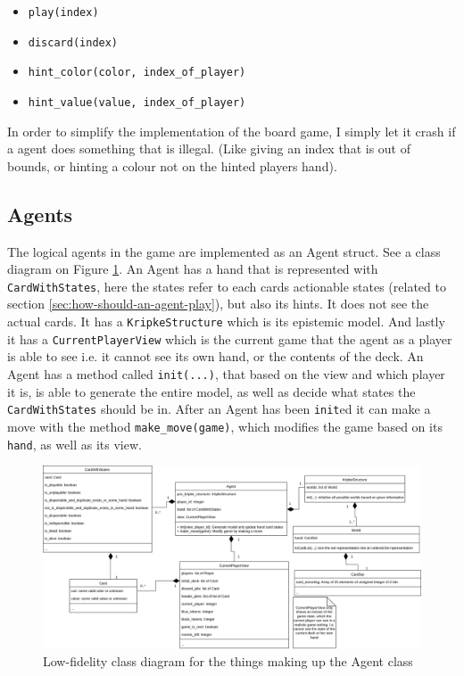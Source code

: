 \begin{itemize}
	\item {\tt play(index)}
	\item {\tt discard(index)}
	\item {\tt hint\_color(color, index\_of\_player) }
	\item {\tt hint\_value(value, index\_of\_player) }
\end{itemize}
In order to simplify the implementation of the board game, I simply let it crash if a agent does something that is illegal. (Like giving an index that is out of bounds, or hinting a colour not on the hinted players hand).


\subsection{Agents}
The logical agents in the game are implemented as an Agent struct. See a class diagram on Figure \ref{fig:Agent-class-diagram}.
An Agent has a hand that is represented with {\tt CardWithStates}, here the states refer to each cards actionable states (related to section \ref{sec:how-should-an-agent-play}), but also its hints. It does not see the actual cards. It has a {\tt KripkeStructure} which is its epistemic model. And lastly it has a {\tt CurrentPlayerView} which is the current game that the agent as a player is able to see i.e. it cannot see its own hand, or the contents of the deck. An Agent has a method called {\tt init(...)}, that based on the view and which player it is, is able to generate the entire model, as well as decide what states the {\tt CardWithStates} should be in. After an Agent has been {\tt init}ed it can make a move with the method {\tt make\_move(game)}, which modifies the game based on its {\tt hand}, as well as its view.

\begin{figure}
\includegraphics[width=22cm]{images/agent-uml-class-diagram.png}
	\caption{Low-fidelity class diagram for the things making up the Agent class}
	\label{fig:Agent-class-diagram}
\end{figure}

